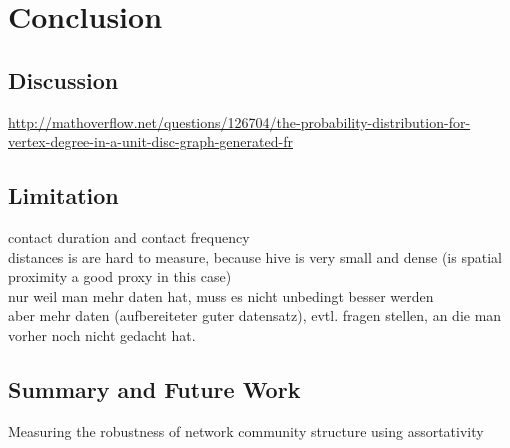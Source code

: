 \chapter{Conclusion}
\label{ch:conclusion}

\section{Discussion}
\url{http://mathoverflow.net/questions/126704/the-probability-distribution-for-vertex-degree-in-a-unit-disc-graph-generated-fr}

\section{Limitation}
contact duration and contact frequency\\
distances is are hard to measure, because hive is very small and dense (is spatial proximity a good proxy in this case)\\

nur weil man mehr daten hat, muss es nicht unbedingt besser werden\\
aber mehr daten (aufbereiteter guter datensatz), evtl. fragen stellen, an die man vorher noch nicht gedacht  hat.\\

\section{Summary and Future Work}
Measuring the robustness of network community structure using assortativity~\cite{shizuka2016measuring}